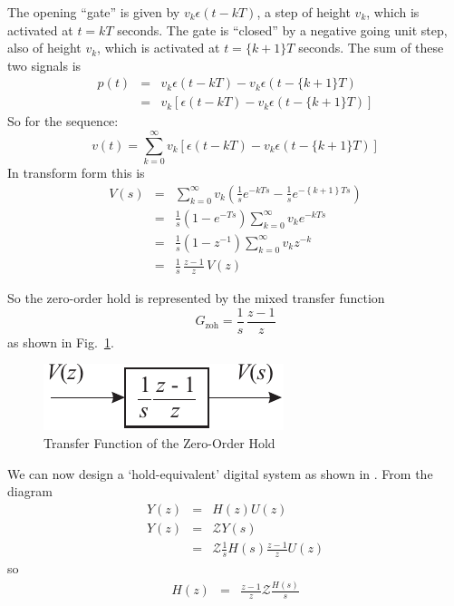 The opening ``gate'' is given by $v_k \epsilon (t-kT)$, a step of height
$v_k$, which is activated at $t=kT$ seconds. The gate is ``closed'' by
a negative going unit step, also of height $v_k$, which is activated
at $t=\{k+1\}T$ seconds. The sum of these two signals is 
\begin{eqnarray*}
  p(t) &=& v_k \epsilon(t - kT) - v_k \epsilon(t - \{k+1\}T)\\
       &=& v_k\left[\epsilon(t - kT) - v_k \epsilon(t - \{k+1\}T)\right]
\end{eqnarray*}
So for the sequence:
\begin{equation}
  \label{eq:l11e5}
  v(t) = \sum_{k=0}^{\infty} v_k\left[\epsilon(t - kT) - v_k \epsilon(t - \{k+1\}T)\right]
\end{equation}
In transform form this is
\begin{eqnarray*}
  V(s) &=& \sum_{k=0}^{\infty} v_k\left(\frac{1}{s}e^{-kTs} -
  \frac{1}{s}e^{-\left\{k+1\right\}Ts}\right)\\
       &=& \frac{1}{s}\left(1-e^{-Ts}\right) \sum_{k=0}^{\infty} v_k
  e^{-kTs}\\
       &=& \frac{1}{s}\left(1-z^{-1}\right) \sum_{k=0}^{\infty} v_k
  z^{-k}\\
       &=& \frac{1}{s}\,\frac{z-1}{z}\,V(z)
\end{eqnarray*}

So the zero-order hold is represented by the mixed transfer function 
\begin{equation}
  \label{eq:l11e10}
  G_{\mathrm{zoh}}=\frac{1}{s}\,\frac{z-1}{z}
\end{equation}
as shown in Fig.~\ref{fig:l11f2}.
\begin{figure}[htbp]
  \begin{center}
    \includegraphics{pictures/zohtf.pdf}
    \caption{Transfer Function of the Zero-Order Hold}
    \label{fig:l11f2}
  \end{center}
\end{figure}

We can now design a `hold-equivalent' digital system as shown in
. From the diagram
\begin{eqnarray*}
  Y(z) &=& H(z) U(z)\\
  Y(z) &=& \mathcal{Z} Y(s)\\
       &=& \mathcal{Z} \frac{1}{s} H(s) \frac{z-1}{z} U(z)
\end{eqnarray*}
so
\begin{eqnarray}\label{eq:l11e14}
  H(z) &=& \frac{z-1}{z} \mathcal{Z} \frac{H(s)}{s}
\end{eqnarray}

